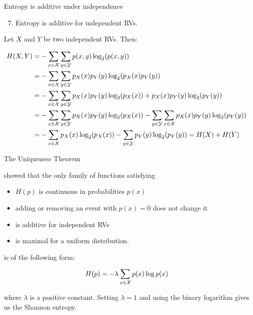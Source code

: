 \documentclass[11pt,compress,t,notes=noshow, xcolor=table]{beamer}
\begin{document}
\begin{vbframe} {Entropy is additive under independence}
\begin{enumerate}
\setcounter{enumi}{6}
    \item Entropy is additive for independent RVs.
\end{enumerate}
\vspace{0.2cm}
Let $X$ and $Y$ be two independent RVs. Then:
  \begin{small}
  \begin{equation*}
    \begin{aligned} 
     H(X,Y) &= - \sum_{x \in \mathcal{X}} \sum_{y \in \mathcal{Y}}  p(x,y) \log_2(p(x,y)) \\ 
            &= - \sum_{x \in \mathcal{X}} \sum_{y \in \mathcal{Y}}  p_X(x)p_Y(y) \log_2(p_X(x)p_Y(y)) \\
            &= - \sum_{x \in \mathcal{X}} \sum_{y \in \mathcal{Y}}  p_X(x)p_Y(y)\log_2(p_X(x)) + p_X(x)p_Y(y)\log_2(p_Y(y)) \\
            &= - \sum_{x \in \mathcal{X}} \sum_{y \in \mathcal{Y}}  p_X(x)p_Y(y)\log_2(p_X(x)) - \sum_{y \in \mathcal{Y}} \sum_{x \in \mathcal{X}} p_X(x)p_Y(y)\log_2(p_Y(y)) \\
            &= - \sum_{x \in \mathcal{X}} p_X(x)\log_2(p_X(x)) - \sum_{y \in \mathcal{Y}} p_Y(y)\log_2(p_Y(y)) = H(X) + H(Y)
    \end{aligned} 
  \end{equation*}
\end{small}
\end{vbframe}



\begin{vbframe}{The Uniqueness Theorem}

 showed that the only family of functions satisfying
\begin{itemize}
  \item $H(p)$ is continuous in probabilities $p(x)$
  \item adding or removing an event with $p(x)=0$ does not change it
  \item is additive for independent RVs
  \item is maximal for a uniform distribution.
\end{itemize}

is of the following form:

$$ H(p) = - \lambda \sum_{x \in \mathcal{X}} p(x) \log p(x) $$ 

where $\lambda$ is a positive constant. Setting $\lambda = 1$ and using the binary logarithm gives us the Shannon entropy.
\end{vbframe}
\end{document}
